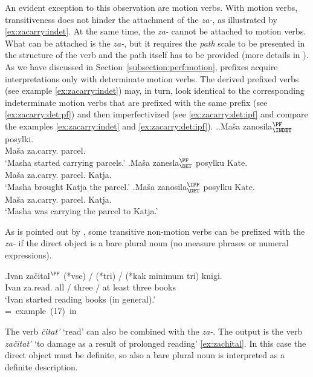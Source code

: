 An evident exception to this observation are motion verbs. With motion verbs, transitiveness does not hinder the attachment of the  \textit{za-}, as illustrated by \ref{ex:zacarry:indet}. At the same time, the  \textit{za-} cannot be attached to motion verbs. What can be attached is the  \textit{za-}, but it requires the \textit{path} scale to be presented in the structure of the verb and the path itself has to be provided (more details in \citealt{ZinovaOsswald:paper}). As we have discussed in Section~\ref{subsection:perf:motion}, prefixes acquire  interpretations only with determinate motion verbs. The derived prefixed verbs (see example \ref{ex:zacarry:indet}) may, in turn, look identical to the corresponding indeterminate motion verbs that are prefixed with the same prefix (see \ref{ex:zacarry:det:pf}) and then imperfectivized (see \ref{ex:zacarry:det:ipf} and compare the examples \ref{ex:zacarry:indet} and \ref{ex:zacarry:det:ipf}).
 \ex.\label{ex:zacarry}\ag.\label{ex:zacarry:indet}Ma\v{s}a zanosila$^{\PF}_{\text{\INDET}}$ posylki.\\
 Ma\v{s}a za.carry. parcel.\\
 \trans `Masha started carrying parcels.'
\bg.\label{ex:zacarry:det:pf}Ma\v{s}a zanesla$^{\PF}_{\text{\DET}}$ posylku Kate.\\
 Ma\v{s}a za.carry. parcel. Katja.\\
 \trans `Masha brought Katja the parcel.'
\bg.\label{ex:zacarry:det:ipf}Ma\v{s}a zanosila$^{\IPF}_{\text{\DET}}$ posylku Kate.\\
 Ma\v{s}a za.carry. parcel. Katja.\\
 \trans `Masha was carrying the parcel to Katja.'
 
As is pointed out by \citet[227]{Braginsky:08}, some transitive non-motion verbs can be prefixed with the  \textit{za-} if the direct object is a bare plural noun (no measure phrases or numeral expressions).

\exg.Ivan za\v{c}ital$^{\PF}$ (*vse) / (*tri) / (*kak minimum tri) knigi.\\
Ivan za.read. all / three / at least three books\\
\trans `Ivan started reading books (in general).'\\\hbox{}\hfill\hbox{= example (17) in \citealt[227]{Braginsky:08}}

The verb \textit{\v{c}itat'} `read' can also be combined with the  \textit{za-}. The output is the verb \textit{za\v{c}itat'} `to damage as a result of prolonged reading' \ref{ex:zachital}. In this case the direct object must be definite, so also a bare plural noun is interpreted as a definite description.

